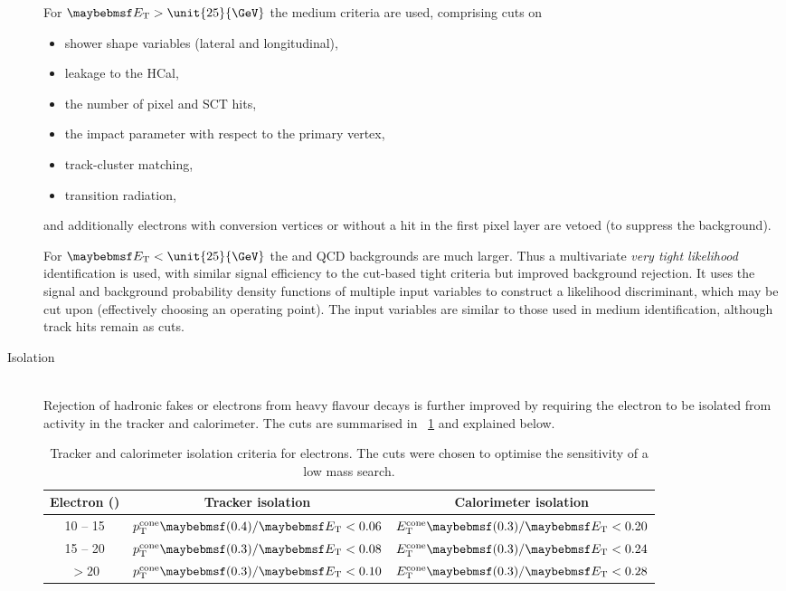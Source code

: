 \begin{description}
	For $\et > \unit{25}{\GeV}$ the medium criteria are used, comprising cuts on
	\begin{itemize}[noitemsep,nolistsep]
		\item shower shape variables (lateral and longitudinal),
		\item leakage to the \ac{HCal},
		\item the number of pixel and \acs{SCT} hits,
		\item the impact parameter with respect to the primary vertex,
		\item track-cluster matching,
		\item transition radiation,
	\end{itemize}
	and additionally electrons with conversion vertices or without a hit in the first 
	pixel layer are vetoed (to suppress the \Wgamma background).
 
 	For $\et < \unit{25}{\GeV}$ the \Wjets and QCD backgrounds are much larger. Thus a 
 	multivariate \textit{very tight likelihood} identification is used, with similar 
 	signal efficiency to the cut-based tight criteria but improved background rejection. 
 	It uses the signal and background probability density functions of multiple input 
 	variables to construct a likelihood discriminant, which may be cut upon (effectively 
 	choosing an operating point). The input variables are similar to those used in 
 	medium identification, although track hits remain as cuts.

\item[Isolation] \hfill \\
	Rejection of hadronic fakes or electrons from heavy flavour decays is further 
	improved by requiring the electron to be isolated from activity in the tracker and 
	calorimeter. The cuts are summarised in \Table~\ref{tab:objects:el_iso} and explained 
	below.

	\begin{table}[b]
		\begin{tabular}{c@{\hskip 0.3in}c@{\hskip 0.3in}c}
			Electron \et (\GeV) & Tracker isolation & Calorimeter isolation \\
			\hline
			10 -- 15 & $p_{\text{T}}^{\text{cone}}\parenths{0.4}/\et < 0.06$ & $E_{\text{T}}^{\text{cone}}\parenths{0.3}/\et < 0.20$ \\
			15 -- 20 & $p_{\text{T}}^{\text{cone}}\parenths{0.3}/\et < 0.08$ & $E_{\text{T}}^{\text{cone}}\parenths{0.3}/\et < 0.24$ \\
			$> 20$   & $p_{\text{T}}^{\text{cone}}\parenths{0.3}/\et < 0.10$ & $E_{\text{T}}^{\text{cone}}\parenths{0.3}/\et < 0.28$ \\
		\end{tabular}
		\caption{Tracker and calorimeter isolation criteria for electrons. The cuts 
		were chosen to optimise the sensitivity of a low mass \HWWlvlv search.}
		\label{tab:objects:el_iso}
	\end{table}


\end{description}

